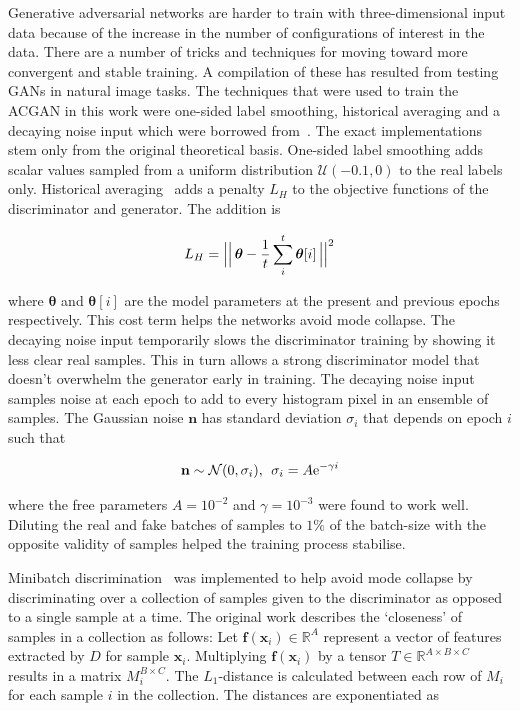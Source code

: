 \documentclass[twocolumn]{article}
\numberwithin{equation}{section}
\begin{document}
Generative adversarial networks are harder to train with three-dimensional input data because of the increase in the 
number of configurations of interest in the data. There are a number of tricks and techniques for moving toward more 
convergent and stable training. A compilation of these has resulted from testing GANs in natural image tasks. The techniques
that were used to train the ACGAN in this work were one-sided label smoothing, historical averaging and a decaying noise 
input which were borrowed from~\cite{gantricks_sali, gan_noise_decay}. The exact implementations stem only from the 
original theoretical basis. One-sided label smoothing adds scalar values sampled from a uniform distribution $\mathcal{U}
(-0.1,0)$ to the real labels only. Historical averaging~\cite{gantricks_sali} adds a penalty $L_H$ to the objective functions 
of the discriminator and generator. The addition is

\begin{equation}
    L_H = \Bigl\lvert\Bigl\lvert \, \bm{\theta} - \frac{1}{t} \sum_i^t\bm{\theta}[i] \,  \Bigr\rvert\Bigr\rvert^2
\end{equation}

where $\bm{\theta}$ and $\bm{\theta}[i]$ are the model parameters at the present and previous epochs respectively. This
cost term helps the networks avoid mode collapse. The decaying noise input temporarily slows the discriminator training
by showing it less clear real samples. This in turn allows a strong discriminator model that doesn't overwhelm the generator
early in training. The decaying noise input samples noise at each epoch to add to every histogram pixel in an ensemble of
samples. The Gaussian noise $\mathbf{n}$ has standard deviation $\sigma_i$ that depends on epoch $i$ such that 

\begin{equation}
    \mathbf{n} \sim \mathcal{N}(0,\sigma_i), \: \: \sigma_i = A \textup{e}^{-\gamma i}
\end{equation}

where the free parameters $A=10^{-2}$ and $\gamma=10^{-3}$ were found to work well. Diluting the real and fake batches of 
samples to $1\%$ of the batch-size with the opposite validity of samples helped the training process stabilise.

Minibatch discrimination~\cite{gantricks_sali} was implemented to help avoid mode collapse by discriminating over a 
collection of samples given to the discriminator as opposed to a single sample at a time. The original work describes 
the `closeness' of samples in a collection as follows: Let $\mathbf{f}(\bm{x}_i) \in \mathbb{R}^A$ represent a vector of 
features extracted by $D$ for sample $\mathbf{x}_i$. Multiplying $\mathbf{f}(\bm{x}_i)$ by a tensor $T \in \mathbb{R}^{A\times 
B\times C}$ results in a matrix $M_i^{B\times C}$. The $L_1$-distance is calculated between each row of $M_i$ for each sample 
$i$ in the collection. The distances are exponentiated as
\end{document}
